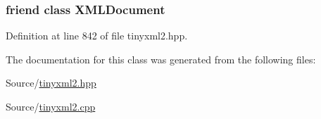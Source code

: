 \hypertarget{classtinyxml2_1_1_x_m_l_text_a4eee3bda60c60a30e4e8cd4ea91c4c6e}{
\subsubsection[{X\-M\-L\-Document}]{\setlength{\rightskip}{0pt plus 5cm}friend class {\bf X\-M\-L\-Document}\hspace{0.3cm}{\ttfamily [friend]}}}\label{classtinyxml2_1_1_x_m_l_text_a4eee3bda60c60a30e4e8cd4ea91c4c6e}


Definition at line 842 of file tinyxml2.\-hpp.



The documentation for this class was generated from the following files\-:\begin{DoxyCompactItemize}
\item 
Source/\hyperlink{tinyxml2_8hpp}{tinyxml2.\-hpp}\item 
Source/\hyperlink{tinyxml2_8cpp}{tinyxml2.\-cpp}\end{DoxyCompactItemize}
